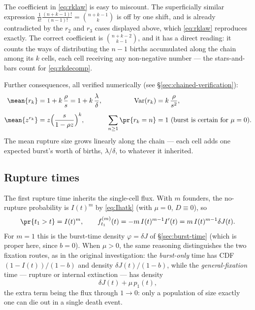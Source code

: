 \begin{remark}
The coefficient in \eqref{eq:rklaw} is easy to miscount. The superficially
similar expression $\frac{1}{k!}\frac{(n+k-1)!}{(n-1)!}
=\binom{n+k-1}{k}$ is off by one shift, and is already contradicted by the
$r_2$ and $r_3$ cases displayed above, which \eqref{eq:rklaw} reproduces
exactly. The correct coefficient is $\binom{n+k-2}{k-1}$, and it has a
direct reading: it counts the ways of distributing the $n-1$ births
accumulated along the chain among its $k$ cells, each cell receiving any
non-negative number --- the stars-and-bars count for \eqref{eq:rkdecomp}.
\end{remark}

Further consequences, all verified numerically (see
\S\ref{sec:chained-verification}):
\begin{align}
\mean{r_k}&=1+k\,\frac{\rho}{s}=1+k\,\frac{\lambda}{\delta},
&
\mathrm{Var}(r_k)&=k\,\frac{\rho}{s^2},
\label{eq:rkmoments}\\[0.4em]
\mean{z^{r_k}}&=z\Bigl(\frac{s}{1-\rho z}\Bigr)^k,
&
\sum_{n\ge1}\pr{r_k=n}&=1\ \text{(burst is certain for $\mu=0$)}.
\label{eq:rkgf}
\end{align}
The mean rupture size grows linearly along the chain --- each cell adds one
expected burst's worth of births, $\lambda/\delta$, to whatever it inherited.

\subsection{Rupture times}
\label{sec:rupture-times}

The first rupture time inherits the single-cell flux. With $m$ founders, the
no-rupture probability is $I(t)^m$ by \eqref{eq:Ihatk} (with $\mu=0$,
$D\equiv0$), so
\begin{equation}
\pr{t_1>t}=I(t)^m,
\qquad
f_{t_1}^{(m)}(t)=-m\,I(t)^{m-1}I'(t)=m\,I(t)^{m-1}\delta J(t).
\label{eq:t1m}
\end{equation}
For $m=1$ this is the burst-time density $\varphi=\delta J$ of
\S\ref{sec:burst-time} (which is proper here, since $b=0$). When $\mu>0$,
the same reasoning distinguishes the two fixation routes, as in the
original investigation: the \emph{burst-only} time has CDF
$(1-I(t))/(1-b)$ and density $\delta J(t)/(1-b)$, while the
\emph{general-fixation} time --- rupture or internal extinction --- has
density
\begin{equation}
\delta J(t)+\mu\,p_1(t),
\end{equation}
the extra term being the flux through $1\to0$: only a population of size
exactly one can die out in a single death event.

